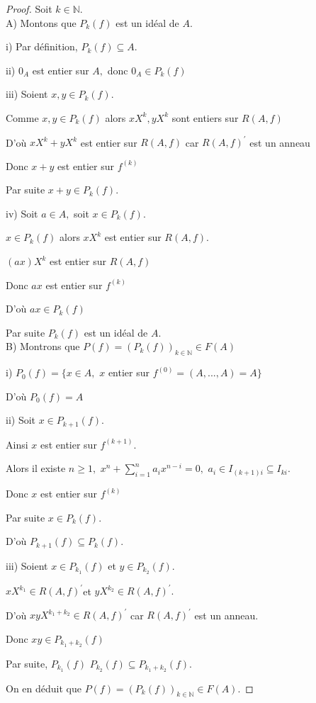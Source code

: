 \begin{proof}
	Soit $k\in \mathbb{N}.$ \\
	A) Montons que $P_{k}(f)$ est un idéal de $A$.
	
	i) Par définition, $P_{k}(f)\subseteq A.$
	
	ii) $0_{A}$ est entier sur $A,$ donc $0_{A}\in P_{k}(f)$
	
	iii) Soient $x,y\in P_{k}(f).$
	
	Comme $x,y\in P_{k}(f)$ alors $xX^{k},yX^{k}$ sont entiers sur $R(A,f)$
	
	D'où $xX^{k}+yX^{k}$ est entier sur $R(A,f)$ car $R(A,f)^{\prime }$ est
	un anneau
	
	Donc $x+y$ est entier sur $f^{(k)}$
	
	Par suite $x+y\in P_{k}(f).$
	
	iv) Soit $a\in A,$ soit $x\in P_{k}(f).$
	
	$x\in P_{k}(f)$ alors $xX^{k}$ est entier sur $R(A,f).$
	
	$(ax)X^{k}$ est entier sur $R(A,f)$
	
	Donc $ax$ est entier sur $f^{(k)}$
	
	D'où $ax\in P_{k}(f)$
	
	Par suite $P_{k}(f)$ est un idéal de $A.$ \\
	B) Montrons que $P(f)=(P_{k}(f))_{k\in \mathbb{N}}\in F(A)$
	
	i) $P_{0}(f)=\{x\in A,$ $x$ entier sur $f^{(0)}=(A,...,A)=A\}$
	
	D'où $P_{0}(f)=A$
	
	ii) Soit $x\in P_{k+1}(f).$
	
	Ainsi $x$ est entier sur $f^{(k+1)}.$
	
	Alors il existe $n\geq 1,$ $x^{n}+\sum\limits_{i=1}^{n}a_{i}x^{n-i}=0,$ $
	a_{i}\in I_{(k+1)i}\subseteq I_{ki}$.
	
	Donc $x$ est entier sur $f^{(k)}$
	
	Par suite $x\in P_{k}(f).$
	
	D'où $P_{k+1}(f)\subseteq P_{k}(f).$
	
	iii) Soient $x\in P_{k_{1}}(f)$ et $y\in P_{k_{2}}(f)$.
	
	$xX^{k_{1}}\in R(A,f)^{\prime }$et $yX^{k_{2}}\in R(A,f)^{\prime }.$
	
	D'où $xyX^{k_{1}+k_{2}}\in R(A,f)^{\prime }$ car $R(A,f)^{\prime }$ est
	un anneau.
	
	Donc $xy\in P_{k_{1}+k_{2}}(f)$
	
	Par suite, $P_{k_{1}}(f)$ $P_{k_{2}}(f)\subseteq P_{k_{1}+k_{2}}(f).$
	
	On en déduit que $P(f)=(P_{k}(f))_{k\in \mathbb{N}}\in F(A).$
\end{proof}

